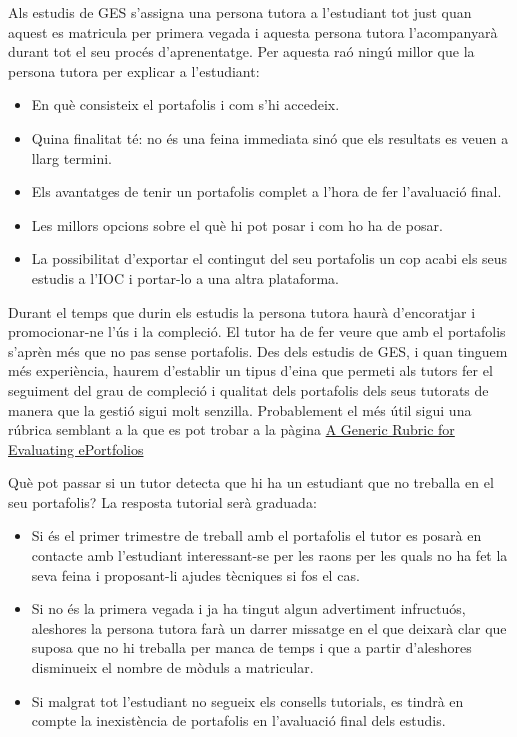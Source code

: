 \documentclass[oneside,a4paper,12pt]{refart}
\begin{document}
Als estudis de GES s'assigna una persona tutora a l'estudiant tot just quan aquest es matricula per primera vegada i aquesta persona tutora l'acompanyarà durant tot el seu procés d'aprenentatge. Per aquesta raó ningú millor que la persona tutora per explicar a l'estudiant:
\begin{itemize}
\item En què consisteix el portafolis i com s'hi accedeix.
\item Quina finalitat té: no és una feina immediata sinó que els resultats es veuen a llarg termini.
\item Els avantatges de tenir un portafolis complet a l'hora de fer l'avaluació final.
\item Les millors opcions sobre el què hi pot posar i com ho ha de posar.
\item La possibilitat d'exportar el contingut del seu portafolis un cop acabi els seus estudis a l'IOC i portar-lo a una altra plataforma.
\end{itemize}

Durant el temps que durin els estudis la persona tutora haurà d'encoratjar i promocionar-ne l'ús i la compleció. El tutor ha de fer veure que amb el portafolis s'aprèn més que no pas sense portafolis. Des dels estudis de GES, i quan tinguem més experiència, haurem d'establir un tipus d'eina que permeti als tutors fer el seguiment del grau de compleció i qualitat dels portafolis dels seus tutorats de manera que la gestió sigui molt senzilla. Probablement el més útil sigui una rúbrica semblant a la que es pot trobar a la pàgina \href{http://tinyurl.com/6zcngk2}{A Generic Rubric for Evaluating ePortfolios}

Què pot passar si un tutor detecta que hi ha un estudiant que no treballa en el seu portafolis? La resposta tutorial serà graduada:
\begin{itemize}
\item Si és el primer trimestre de treball amb el portafolis el tutor es posarà en contacte amb l'estudiant interessant-se per les raons per les quals no ha fet la seva feina i proposant-li ajudes tècniques si fos el cas.
\item Si no és la primera vegada i ja ha tingut algun advertiment infructuós, aleshores la persona tutora farà un darrer missatge en el que deixarà clar que suposa que no hi treballa per manca de temps i que a partir d'aleshores disminueix el nombre de mòduls a matricular.
\item Si malgrat tot l'estudiant no segueix els consells tutorials, es tindrà en compte la inexistència de portafolis en l'avaluació final dels estudis.
\end{itemize}
\end{document}
